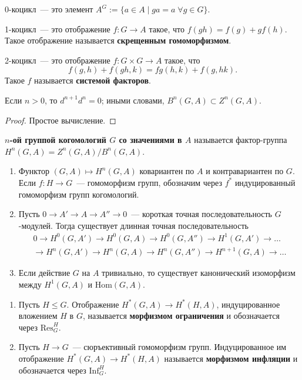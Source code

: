 \documentclass[a4paper,oneside,12pt]{article}
\theoremstyle{plain} { \swapnumbers
\newtheorem{theorem}{Теорема}[subsection]
\newtheorem{corollary}[theorem]{Следствие}
\newtheorem{lemma}[theorem]{Лемма}
\newtheorem{proposition}[theorem]{Утверждение}
\newtheorem{claim}[theorem]{Факт}
}
\theoremstyle{definition} { \swapnumbers
\newtheorem{definition}[theorem]{Определение}
\newtheorem{notation}[theorem]{Обозначение}
\newtheorem{remark}[theorem]{Замечание}
\newtheorem{remarks}[theorem]{Замечания}
\newtheorem{example}[theorem]{Пример}
\newtheorem{examples}[theorem]{Примеры}
\newtheorem{sssection}[theorem]{}
}
\def\Res{\mathrm{Res}}
\def\Inf{\mathrm{Inf}}
\def\Hom{\mathrm{Hom}}
\begin{document}
\begin{examples}
\item 0-коцикл~--- это элемент $A^G:=\{a\in A\mid ga=a\;\forall g\in G\}$.
\item 1-коцикл~--- это отображение $f\colon G\to A$ такое, что $f(gh)=f(g)+gf(h)$.
Такое отображение называется {\bf скрещенным гомоморфизмом}.
\item 2-коцикл~--- это отображение $f\colon G\times G\to A$ такое, что
$$
f(g,h)+f(gh,k)=fg(h,k)+f(g,hk).
$$
Такое $f$ называется {\bf системой факторов}.
\end{examples}

\begin{lemma}
Если $n>0$, то $d^{n+1}d^n=0$; иными словами, $B^n(G,A)\subset Z^n(G,A)$.
\end{lemma}
\begin{proof}
Простое вычисление.
\end{proof}

\begin{definition}
{\bf $n$-ой группой когомологий $G$ со значениями в $A$} называется фактор-группа
$H^n(G,A)=Z^n(G,A)/B^n(G,A)$.
\end{definition}

\begin{proposition}
\begin{enumerate}
\item Функтор $(G,A)\mapsto H^n(G,A)$ ковариантен по $A$ и контравариантен по $G$.
Если $f\colon H\to G$~--- гомоморфизм групп, обозначим через $f^*$ индуцированный
гомоморфизм групп когомологий.
\item Пусть $0\to A'\to A\to A''\to 0$~--- короткая точная последовательность $G$-модулей.
Тогда существует длинная точная последовательность
\begin{multline*}
0\to H^0(G,A')\to H^0(G,A)\to H^0(G,A'')\to H^1(G,A')\to\dots\\
\to H^n(G,A')\to H^n(G,A)\to H^n(G,A'')\to H^{n+1}(G,A)\to\dots
\end{multline*}
\item Если действие $G$ на $A$ тривиально, то существует канонический изоморфизм
между $H^1(G,A)$ и $\Hom(G,A)$.
\end{enumerate}
\end{proposition}

\begin{definition}
\begin{enumerate}
\item Пусть $H\leq G$. Отображение $H^*(G,A)\to H^*(H,A)$, индуцированное вложением $H$ в $G$,
называется {\bf морфизмом ограничения} и обозначается через $\Res^H_G$.
\item Пусть $H\to G$~--- сюръективный гомоморфизм групп. Индуцированное им отображение $H^*(G,A)\to H^*(H,A)$
называется {\bf морфизмом инфляции} и обозначается через $\Inf^H_G$.
\end{enumerate}
\end{definition}
\end{document}
